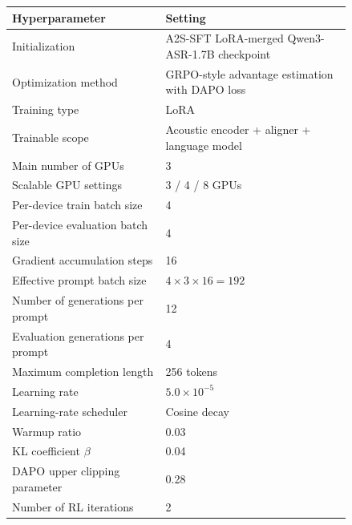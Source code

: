 \documentclass{llmxive}
\begin{document}
\begin{table}[t]
\centering
\small
\begin{tabular}{p{0.38\linewidth} p{0.46\linewidth}}
\toprule
\textbf{Hyperparameter} & \textbf{Setting} \\
\midrule
Initialization
& A2S-SFT LoRA-merged Qwen3-ASR-1.7B checkpoint \\

Optimization method
& GRPO-style advantage estimation with DAPO loss \\

Training type
& LoRA \\

Trainable scope
& Acoustic encoder + aligner + language model \\

Main number of GPUs
& 3 \\

Scalable GPU settings
& 3 / 4 / 8 GPUs \\

Per-device train batch size
& 4 \\

Per-device evaluation batch size
& 4 \\

Gradient accumulation steps
& 16 \\

Effective prompt batch size
& $4 \times 3 \times 16 = 192$ \\

Number of generations per prompt
& 12 \\

Evaluation generations per prompt
& 4 \\

Maximum completion length
& 256 tokens \\

Learning rate
& $5.0 \times 10^{-5}$ \\

Learning-rate scheduler
& Cosine decay \\

Warmup ratio
& 0.03 \\

KL coefficient $\beta$
& 0.04 \\

DAPO upper clipping parameter
& 0.28 \\

Number of RL iterations
& 2 \\


\end{tabular}
\end{table}
\end{document}
